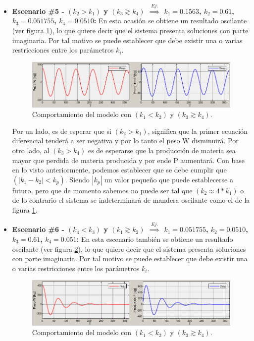 \begin{itemize}
    \pagebreak
    \item \textbf{Escenario \#5 - $(k_{2} > k_{1})$ y $(k_{3}\gtrsim k_{4})$ $\overset{Ej.}{\implies}$ $k_{1}=0.1563$, $k_{2}=0.61$, $k_{3}=0.051755$, $k_{4}=0.0510$:} En esta ocasión se obtiene un resultado oscilante (ver figura \ref{k2Mk1_k3MAPk4png}), lo que quiere decir que el sistema presenta soluciones con parte imaginaria. Por tal motivo se puede establecer que debe existir una o varias restricciones entre los parámetros $k_{i}$.
    
        \begin{figure}[H]
            \centering
            \includegraphics[scale=0.75]{img/k2Mk1_k3MAPk4.png}
            \caption{Comportamiento del modelo con $(k_{1}< k_{2})$ y $(k_{3}\gtrsim k_{4})$. \label{k2Mk1_k3MAPk4png}}
        \end{figure}
    
    Por un lado, es de esperar que si $(k_{2} > k_{1})$, significa que la primer ecuación diferencial tenderá a ser negativa y por lo tanto el peso W disminuirá. Por otro lado, al $(k_{3} > k_{4})$ es de esperarse que la producción de materia sea mayor que perdida de materia producida y por ende P aumentará. Con base en lo visto anteriormente, podemos establecer que se debe cumplir que $(|k_{1} - k_{2}| < k_{p})$. Siendo $|k_{p}|$ un valor pequeño que puede establecerse a futuro, pero que de momento sabemos no puede ser tal que $(k_{2} \approx 4*k_{1})$ o de lo contrario el sistema se indeterminará de mandera oscilante como el de la figura \ref{k2Mk1_k3MAPk4png}.
        
    \item \textbf{Escenario \#6 - $(k_{4}< k_{3})$ y $(k_{1}\gtrsim k_{2})$ $\overset{Ej.}{\implies}$ $k_{1}=0.051755$, $k_{2}=0.0510$, $k_{3}=0.61$, $k_{4}=0.051$:} En esta escenario también se obtiene un resultado oscilante (ver figura \ref{k3Mk4_k1MAPk2png}), lo que quiere decir que el sistema presenta soluciones con parte imaginaria. Por tal motivo se puede establecer que debe existir una o varias restricciones entre los parámetros $k_{i}$.\\

        \begin{figure}[H]
            \centering
            \includegraphics[scale=0.75]{img/k3Mk4_k1MAPk2.png}
            \caption{Comportamiento del modelo con $(k_{1}< k_{2})$ y $(k_{3}\gtrsim k_{4})$. \label{k3Mk4_k1MAPk2png}}
        \end{figure}
    

\end{itemize}
